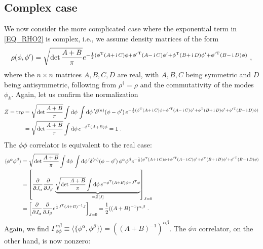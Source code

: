 \documentclass[letter]{article}
\renewcommand{\i}{\,\ensuremath\mathrm{i\,}}
\newcommand{\tr}{\mathrm{tr}}
\newcommand{\intd}[1]{\int\mathrm{d}#1\,}
\begin{document}
\subsection*{Complex case}
We now consider the more complicated case where the exponential term in \eqref{EQ_RHO2} is complex, i.e., we assume density matrices of the form
\begin{equation}
\rho(\phi, \phi^\prime) = \sqrt{\det\frac{A+B}{\pi}} e^{-\frac{1}{2} (\phi^\mathrm{T} (A+\i C) \phi + {\phi^\prime}^\mathrm{T} (A-\i C) \phi^\prime + \phi^\mathrm{T} (B+\i D) \phi^\prime + {\phi^\prime}^\mathrm{T} (B-\i D) \phi ) }\ ,
\end{equation}
where the $n\times n$ matrices $A,B,C,D$ are real, with $A,B,C$ being symmetric and $D$ being antisymmetric, following from $\rho^\dagger=\rho$ and the commutativity of the modes $\phi_k$. Again, let us confirm the normalization
\begin{align}
Z = \tr{\rho} &=  \sqrt{\det\frac{A+B}{\pi}} \intd\phi \intd\phi^\prime  \delta^{(n)}(\phi - \phi^\prime)\, e^{-\frac{1}{2} (\phi^\mathrm{T} (A+\i C) \phi + {\phi^\prime}^\mathrm{T} (A-\i C) \phi^\prime + \phi^\mathrm{T} (B+\i D) \phi^\prime  + {\phi^\prime}^\mathrm{T} (B-\i D) \phi) } \nonumber\\
&= \sqrt{\det\frac{A+B}{\pi}} \intd\phi e^{ -\phi^\mathrm{T} (A+B) \phi} 
= 1\ .
\end{align}
The $\phi\phi$ correlator is equivalent to the real case:
\begin{align}
\langle \phi^\alpha \phi^\beta \rangle &= \sqrt{\det\frac{A+B}{\pi}} \intd\phi \intd\phi^\prime  \delta^{(n)}(\phi - \phi^\prime)\, \phi^\alpha \phi^\beta e^{ -\frac{1}{2} (\phi^\mathrm{T} (A+\i C) \phi + {\phi^\prime}^\mathrm{T} (A-\i C) \phi^\prime + \phi^\mathrm{T} (B+\i D) \phi^\prime + {\phi^\prime}^\mathrm{T} (B-\i D) \phi ) } \nonumber\\
&= \left[ \frac{\partial}{\partial J_\alpha} \frac{\partial}{\partial J_\beta}\, 
\underbrace{\sqrt{\det\frac{A+B}{\pi}} \intd\phi  e^{ -\phi^\mathrm{T} (A+B) \phi + J^\mathrm{T} \phi }}_{= Z[J]} \right]_{J=0} \nonumber\\
&= \left[ \frac{\partial}{\partial J_\alpha} \frac{\partial}{\partial J_\beta} e^{\frac{1}{4} J^\mathrm{T} (A+B)^{-1} J} \right]_{J=0}  = \frac{1}{2} ((A+B)^{-1})^{\alpha,\beta}\ .
\end{align}
Again, we find $\Gamma^{\alpha\beta}_{\phi\phi} \equiv\langle \{ \phi^\alpha, \phi^\beta \} \rangle = ((A+B)^{-1})^{\alpha\beta}$. The $\phi\pi$ correlator, on the other hand, is now nonzero:
\end{document}
